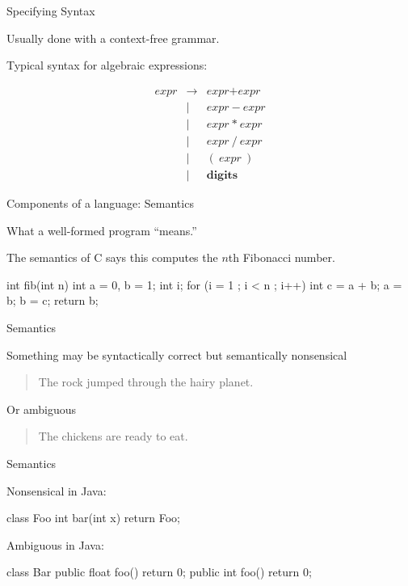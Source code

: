 \documentclass{plt}
\begin{document}
\begin{frame}{Specifying Syntax}

Usually done with a \alert{context-free grammar}.

Typical syntax for algebraic expressions:

\[
\begin{array}{rcl}
\textit{expr} & \rightarrow & \textit{expr} + \textit{expr} \\
& | &  \textit{expr}\ -\ \textit{expr} \\
& | &  \textit{expr}\ *\ \textit{expr} \\
& | &  \textit{expr}\ /\ \textit{expr} \\
& | &  (\ \textit{expr}\ ) \\
& | &  \textbf{digits}
\end{array}
\]

\end{frame}

\begin{frame}[fragile]{Components of a language: Semantics}

\alert{What a well-formed program ``means.''}

The semantics of C says this computes the $n$th Fibonacci number.

\begin{C}
int fib(int n)
{
  int a = 0, b = 1;
  int i;
  for (i = 1 ; i < n ; i++) {
    int c = a + b;
    a = b;
    b = c;
  }
  return b;
}
\end{C}

\end{frame}

\begin{frame}{Semantics}

Something may be syntactically correct but semantically nonsensical

\begin{quote}
The rock jumped through the hairy planet.
\end{quote}

Or ambiguous

\begin{quote}
The chickens are ready to eat.
\end{quote}

\end{frame}

\begin{frame}[fragile]{Semantics}

Nonsensical in Java:

\begin{java}
class Foo {
  int bar(int x) { return Foo; }
}
\end{java}

Ambiguous in Java:

\begin{java}
class Bar {
  public float foo() { return 0; }
  public int foo() { return 0; }
}
\end{java}

\end{frame}
\end{document}
